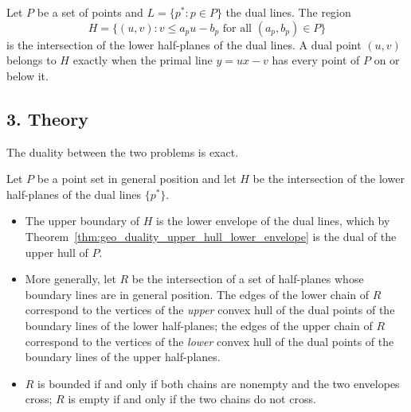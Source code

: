 \begin{definition}\label{def:geo_duality_above_lines}
  Let $P$ be a set of points and $L = \{p^* : p \in P\}$ the dual lines. The
  region
  \[
    H = \{ (u,v) : v \le a_p u - b_p \text{ for all } (a_p,b_p) \in P \}
  \]
  is the intersection of the lower half-planes of the dual lines. A dual
  point $(u,v)$ belongs to $H$ exactly when the primal line
  $y = ux - v$ has every point of $P$ on or below it.
\end{definition}

\subsection{3. Theory}

The duality between the two problems is exact.

\begin{theorem}\label{thm:geo_duality_hpi}
  Let $P$ be a point set in general position and let $H$ be the intersection
  of the lower half-planes of the dual lines $\{p^*\}$.
  \begin{itemize}
    \item The upper boundary of $H$ is the lower envelope of the dual lines,
      which by Theorem~\ref{thm:geo_duality_upper_hull_lower_envelope} is
      the dual of the upper hull of $P$.
    \item More generally, let $R$ be the intersection of a set of half-planes
      whose boundary lines are in general position. The edges of the lower
      chain of $R$ correspond to the vertices of the \emph{upper} convex hull
      of the dual points of the boundary lines of the lower half-planes; the
      edges of the upper chain of $R$ correspond to the vertices of the
      \emph{lower} convex hull of the dual points of the boundary lines of
      the upper half-planes.
    \item $R$ is bounded if and only if both chains are nonempty and the two
      envelopes cross; $R$ is empty if and only if the two chains do not
      cross.
  \end{itemize}
\end{theorem}

